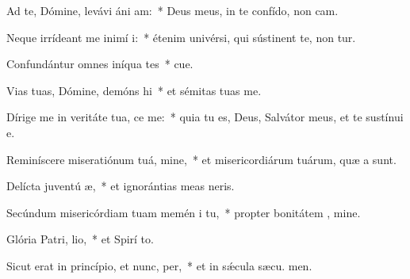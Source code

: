 \item Ad te, Dómine, levávi áni am:~* Deus meus, in te confído, non cam.
\item Neque irrídeant me inimí i:~* étenim univérsi, qui sústinent te, non tur.
\item Confundántur omnes iníqua tes~* cue.
\item Vias tuas, Dómine, demóns hi~* et sémitas tuas  me.
\item Dírige me in veritáte tua,  ce me:~* quia tu es, Deus, Salvátor meus, et te sustínui  e.
\item Reminíscere miseratiónum tuá, mine,~* et misericordiárum tuárum, quæ a  sunt.
\item Delícta juventú æ,~* et ignorántias meas  neris.
\item Secúndum misericórdiam tuam memén i tu,~* propter bonitátem , mine.
\item Glória Patri,  lio,~* et Spirí to.
\item Sicut erat in princípio, et nunc,  per,~* et in sǽcula sæcu. men.

